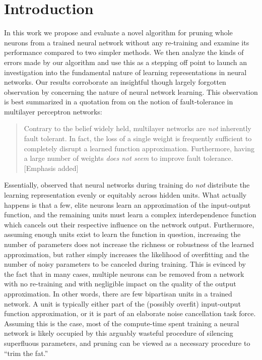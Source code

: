 \section{Introduction}\label{sec1}

In this work we propose and evaluate a novel algorithm for pruning whole neurons from a trained neural network without any re-training and examine its performance compared to two simpler methods. We then analyze the kinds of errors made by our algorithm and use this as a stepping off point to launch an investigation into the fundamental nature of learning representations in neural networks. Our results corroborate an insightful though largely forgotten observation by \cite{mozer1989skeletonization} concerning the nature of neural network learning. This observation is best summarized in a quotation from \cite{segee1991fault} on the notion of fault-tolerance in multilayer perceptron networks:

\begin{quotation}
Contrary to the belief widely held, multilayer networks are \textit{not} inherently fault tolerant. In fact, the loss of a single weight is frequently sufficient to completely disrupt a learned function approximation. Furthermore, having a large number of weights \textit{does not seem} to improve fault tolerance. [Emphasis added]
\end{quotation}

Essentially, \cite{mozer1989using} observed that neural networks during training do \textit{not} distribute the learning representation evenly or equitably across hidden units. What actually happens is that a few, elite neurons learn an approximation of the input-output function, and the remaining units must learn a complex interdependence function which cancels out their respective influence on the network output. Furthermore, assuming enough units exist to learn the function in question, increasing the number of parameters does not increase the richness or robustness of the learned approximation, but rather simply increases the likelihood of overfitting and the number of noisy parameters to be canceled during training. This is evinced by the fact that in many cases, multiple neurons can be removed from a network with no re-training and with negligible impact on the quality of the output approximation. In other words, there are few bipartisan units in a trained network. A unit is typically either part of the (possibly overfit) input-output function approximation, or it is part of an elaborate noise cancellation task force. Assuming this is the case, most of the compute-time spent training a neural network is likely occupied by this arguably wasteful procedure of silencing superfluous parameters, and pruning can be viewed as a necessary procedure to ``trim the fat.''

